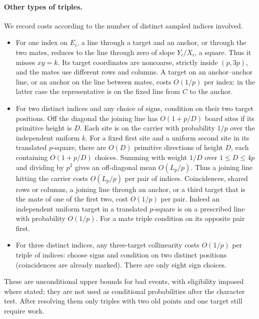 \documentclass[11pt]{article}
\begin{document}
\paragraph{Other types of triples.} We record costs according to the number of distinct sampled indices involved.
\begin{itemize}
\item For one index on $E_i$, a line through a target and an anchor, or through the two mates, reduces to the line through zero of slope $Y_i/X_i$, a square. Thus it misses $xy=k$. Its target coordinates are noncoarse, strictly inside $(p,3p)$, and the mates use different rows and columns. A target on an anchor--anchor line, or an anchor on the line between mates, costs $O(1/p)$ per index: in the latter case the representative is on the fixed line from $C$ to the anchor.
\item For two distinct indices and any choice of signs, condition on their two target positions. Off the diagonal the joining line has $O(1+p/D)$ board sites if its primitive height is $D$. Each site is on the carrier with probability $1/p$ over the independent uniform $k$. For a fixed first site and a uniform second site in its translated $p$-square, there are $O(D)$ primitive directions of height $D$, each containing $O(1+p/D)$ choices. Summing with weight $1/D$ over $1\le D\le4p$ and dividing by $p^2$ gives an off-diagonal mean $O(L_p/p)$. Thus a joining line hitting the carrier costs $O(L_p/p)$ per pair of indices. Coincidences, shared rows or columns, a joining line through an anchor, or a third target that is the mate of one of the first two, cost $O(1/p)$ per pair. Indeed an independent uniform target in a translated $p$-square is on a prescribed line with probability $O(1/p)$. For a mate triple condition on its opposite pair first.
\item For three distinct indices, any three-target collinearity costs $O(1/p)$ per triple of indices: choose signs and condition on two distinct positions (coincidences are already marked). There are only eight sign choices.
\end{itemize}
These are unconditional upper bounds for bad events, with eligibility imposed where stated; they are not used as conditional probabilities after the character test. After resolving them only triples with two old points and one target still require work.
\end{document}
